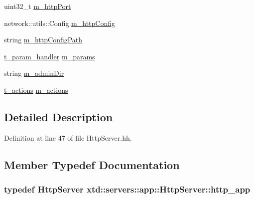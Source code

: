 \begin{DoxyCompactItemize}
uint32\-\_\-t \hyperlink{classxtd_1_1servers_1_1app_1_1HttpServer_a75ed3bcfa895cad365f6bf0955efcf9e}{m\-\_\-http\-Port}
\item 
network\-::utils\-::\-Config \hyperlink{classxtd_1_1servers_1_1app_1_1HttpServer_ad5f2480d758b731b641e4858f556a3c3}{m\-\_\-http\-Config}
\item 
string \hyperlink{classxtd_1_1servers_1_1app_1_1HttpServer_abfb9586e84fa5149da3226eeea39980f}{m\-\_\-http\-Config\-Path}
\item 
\hyperlink{classxtd_1_1servers_1_1app_1_1HttpServer_a9704ed4f011ec3a7424da2f2229477e1}{t\-\_\-param\-\_\-handler} \hyperlink{classxtd_1_1servers_1_1app_1_1HttpServer_ac4f9a2c40867f4f2ba8d30ec9876e51e}{m\-\_\-params}
\item 
string \hyperlink{classxtd_1_1servers_1_1app_1_1HttpServer_ad12543f950574ac8a0d813cb4ceeff4c}{m\-\_\-admin\-Dir}
\item 
\hyperlink{classxtd_1_1servers_1_1app_1_1HttpServer_ac61c9a29bf64b94cb8ca4c766f8309c3}{t\-\_\-actions} \hyperlink{classxtd_1_1servers_1_1app_1_1HttpServer_afa5363da18a3aa9de651e53e409116e9}{m\-\_\-actions}
\end{DoxyCompactItemize}


\subsection{Detailed Description}


Definition at line 47 of file Http\-Server.\-hh.



\subsection{Member Typedef Documentation}
\hypertarget{classxtd_1_1servers_1_1app_1_1HttpServer_ad879d72fb0151a3c383ccbe75bb642cc}{
\subsubsection[{http\-\_\-app}]{\setlength{\rightskip}{0pt plus 5cm}typedef {\bf Http\-Server} {\bf xtd\-::servers\-::app\-::\-Http\-Server\-::http\-\_\-app}\hspace{0.3cm}{\ttfamily [protected]}}}\label{classxtd_1_1servers_1_1app_1_1HttpServer_ad879d72fb0151a3c383ccbe75bb642cc}


